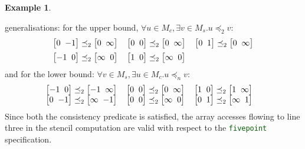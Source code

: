 \documentclass[9pt,preprint]{sigplanconf}
\newcounter{block}
\theoremstyle{definition}
\newtheorem{example}[block]{Example}
\newcommand{\vtwoh}[2]{\setlength{\arraycolsep}{0em}
\left[\begin{array}{cc}#1 \; & \; #2\end{array}\right]}
\begin{document}
\begin{example}
\begin{enumerate}
  generalisations: for the upper bound, $\forall u \in M_c,
  \exists v \in M_s . u \preceq_2 v$: 
  \begin{align}
    \begin{array}{l}
     \vtwoh{0}{-1} \preceq_2 \vtwoh{0}{\infty} \quad
     \vtwoh{0}{0} \preceq_2 \vtwoh{0}{\infty} \quad
     \vtwoh{0}{1} \preceq_2 \vtwoh{0}{\infty} \\[0.5em]
     \vtwoh{-1}{0} \preceq_2 \vtwoh{\infty}{0} \quad
     \vtwoh{1}{0} \preceq_2 \vtwoh{\infty}{0}
     \end{array}
  \label{eq:check-example-upper}
  \end{align}
  and for the lower bound: $\forall v \in M_s, \exists u \in M_c . u
  \preceq_n v$: 
  \begin{align}
    \hspace{-1em}
    \begin{array}{l}
     \vtwoh{-1}{0} \preceq_2 \vtwoh{-1}{\infty} \quad
     \vtwoh{0}{0} \preceq_2 \vtwoh{0}{\infty} \quad
     \vtwoh{1}{0} \preceq_2 \vtwoh{1}{\infty}  \\
     \vtwoh{0}{-1}  \preceq_2 \vtwoh{\infty}{-1} \quad
     \vtwoh{0}{0}  \preceq_2 \vtwoh{\infty}{0} \quad
     \vtwoh{0}{1}  \preceq_2 \vtwoh{\infty}{1}
     \end{array}
    \label{eq:check-example-lower}
  \end{align}
  Since both the consistency predicate is satisfied, the array
  accesses flowing to line three in the stencil computation are valid
  with respect to the {\textcolor{darkgreen}{\texttt{fivepoint}}} specification.
\end{enumerate}
\vspace{-0.7em}
\end{example}
\end{document}
